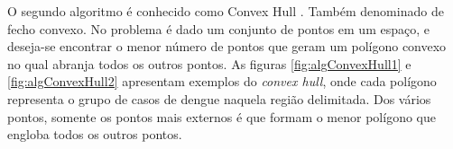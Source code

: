 O segundo algoritmo é conhecido como Convex Hull \cite{ConvexHull}. Também denominado de fecho convexo. No problema é dado um conjunto de pontos em um espaço, e deseja-se encontrar o menor número de pontos que geram um polígono convexo no qual abranja todos os outros pontos.
As figuras \ref{fig:algConvexHull1} e \ref{fig:algConvexHull2} apresentam exemplos do \emph{convex hull}, onde cada polígono representa o grupo de casos de dengue naquela região delimitada. Dos vários pontos, somente os pontos mais externos é que formam o menor polígono que engloba todos os outros pontos.
%
\begin{figure}[!ht]
	\centering	
\end{figure}
\FloatBarrier
\begin{figure}[!ht]
	\centering	
\end{figure}
\FloatBarrier